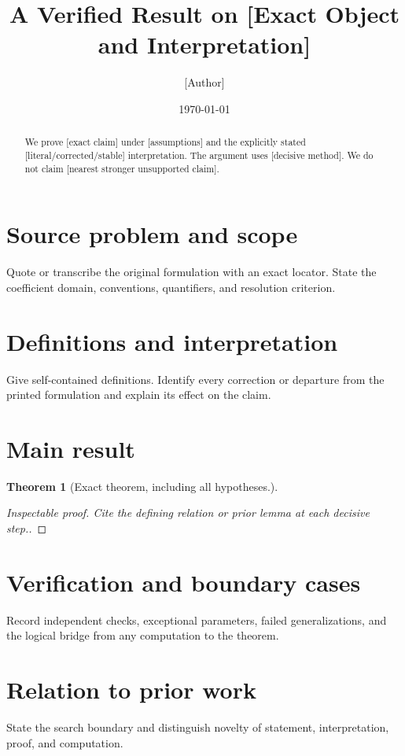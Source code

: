 \documentclass[11pt]{article}
\title{A Verified Result on [Exact Object and Interpretation]}
\author{[Author]}
\date{\today}
\newtheorem{theorem}{Theorem}
\theoremstyle{remark}
\begin{document}
\maketitle

\begin{abstract}
We prove [exact claim] under [assumptions] and the explicitly stated
[literal/corrected/stable] interpretation. The argument uses [decisive method].
We do not claim [nearest stronger unsupported claim].
\end{abstract}

\section{Source problem and scope}
Quote or transcribe the original formulation with an exact locator. State the
coefficient domain, conventions, quantifiers, and resolution criterion.

\section{Definitions and interpretation}
Give self-contained definitions. Identify every correction or departure from
the printed formulation and explain its effect on the claim.

\section{Main result}
\begin{theorem}
[Exact theorem, including all hypotheses.]
\end{theorem}

\begin{proof}
[Inspectable proof. Cite the defining relation or prior lemma at each decisive
step.]
\end{proof}

\section{Verification and boundary cases}
Record independent checks, exceptional parameters, failed generalizations, and
the logical bridge from any computation to the theorem.

\section{Relation to prior work}
State the search boundary and distinguish novelty of statement, interpretation,
proof, and computation.
\end{document}
